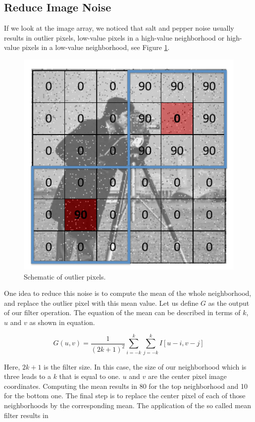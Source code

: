 \subsection{Reduce Image Noise}

If we look at the image array, we noticed that salt and pepper noise usually results in
outlier pixels, low-value pixels in a high-value neighborhood or high-value pixels in a low-value neighborhood, see Figure \ref{camera_man_2}. 

\begin{figure}[!htb]
\begin{center}
\includegraphics[scale=0.380]{img/visual_perception/camera_man_2.jpeg}
\end{center}
\caption{Schematic of outlier pixels.}
\label{camera_man_2}
\end{figure}

One idea to reduce this noise is to compute the mean of
the whole neighborhood, and replace the outlier pixel
with this mean value. Let us define $G$ as the output
of our filter operation. The equation of the mean can
be described in terms of $k$, $u$ and $v$ as shown in equation.

\begin{equation}
G(u,v) = \frac{1}{(2k+1)^2} \sum_{i=-k}^{k}\sum_{j=-k}^{k} I[u-i, v-j]
\label{simple_filter_equation}
\end{equation} 


Here, $2k+1$ is the filter size. In this case, the size of
our neighborhood which is three leads to a $k$
that is equal to one. $u$ and $v$ are the center pixel
image coordinates. Computing the mean
results in 80 for the top neighborhood and
10 for the bottom one. The final step is to
replace the center pixel of each of those neighborhoods
by the corresponding mean. The application of the so called mean filter results in

